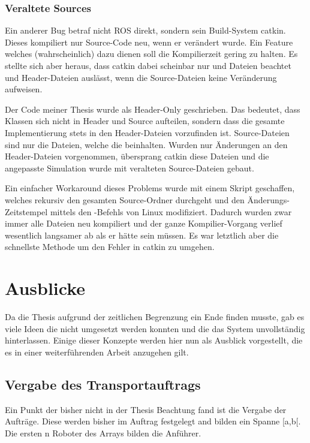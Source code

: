 \subsubsection*{Veraltete Sources}
Ein anderer Bug betraf nicht \ac{ROS} direkt, sondern sein Build-System catkin. Dieses kompiliert nur Source-Code neu, wenn er verändert wurde. Ein Feature welches (wahrscheinlich) dazu dienen soll die Kompilierzeit gering zu halten. Es stellte sich aber heraus, dass catkin dabei scheinbar nur  und  Dateien beachtet und Header-Dateien auslässt, wenn die Source-Dateien keine Veränderung aufweisen.

Der Code meiner Thesis wurde als Header-Only geschrieben. Das bedeutet, dass Klassen sich nicht in Header und Source aufteilen, sondern dass die gesamte Implementierung stets in den Header-Dateien vorzufinden ist. Source-Dateien sind nur die Dateien, welche die  beinhalten. Wurden nur Änderungen an den Header-Dateien vorgenommen, übersprang catkin diese Dateien und die angepasste Simulation wurde mit veralteten Source-Dateien gebaut.

Ein einfacher Workaround dieses Problems wurde mit einem Skript geschaffen, welches rekursiv den gesamten Source-Ordner durchgeht und den Änderungs-Zeitstempel mittels den -Befehls\cite{Ubuntu_touch} von Linux modifiziert. Dadurch wurden zwar immer alle Dateien neu kompiliert und der ganze Kompilier-Vorgang verlief wesentlich langsamer ab als er hätte sein müssen. Es war letztlich aber die schnellste Methode um den Fehler in catkin zu umgehen.





\section{Ausblicke}

Da die Thesis aufgrund der zeitlichen Begrenzung ein Ende finden musste, gab es viele Ideen die nicht umgesetzt werden konnten und die das System unvollständig hinterlassen. Einige dieser Konzepte werden hier nun als Ausblick vorgestellt, die es in einer weiterführenden Arbeit anzugehen gilt.

\subsection*{Vergabe des Transportauftrags}

Ein Punkt der bisher nicht in der Thesis Beachtung fand ist die Vergabe der Aufträge. Diese werden bisher im Auftrag festgelegt and bilden ein Spanne [a,b[. Die ersten n Roboter des Arrays bilden die Anführer.

